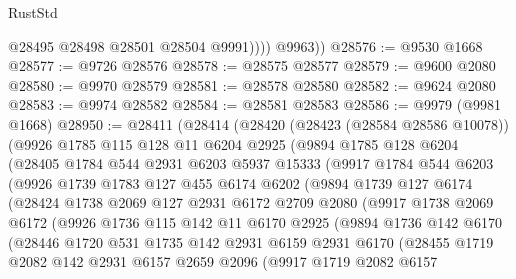 \begin{lexlean}{RustStd}
\begin{coremodule}
                @28495
                @28498
                @28501
                @28504
                @9991))))
        @9963))
@28576 := @9530 @1668
@28577 := @9726 @28576
@28578 := @28575 @28577
@28579 := @9600 @2080
@28580 := @9970 @28579
@28581 := @28578 @28580
@28582 := @9624 @2080
@28583 := @9974 @28582
@28584 := @28581 @28583
@28586 := @9979 (@9981 @1668)
@28950 := @28411
    (@28414
      (@28420
        (@28423 (@28584 @28586 @10078))
        (@9926
          @1785
          @115
          @128
          @11
          @6204
          @2925
          (@9894
            @1785
            @128
            @6204
            (@28405
              @1784
              @544
              @2931
              @6203
              @5937
              @15333
              (@9917
                @1784
                @544
                @6203
                (@9926
                  @1739
                  @1783
                  @127
                  @455
                  @6174
                  @6202
                  (@9894
                    @1739
                    @127
                    @6174
                    (@28424
                      @1738
                      @2069
                      @127
                      @2931
                      @6172
                      @2709
                      @2080
                      (@9917
                        @1738
                        @2069
                        @6172
                        (@9926
                          @1736
                          @115
                          @142
                          @11
                          @6170
                          @2925
                          (@9894
                            @1736
                            @142
                            @6170
                            (@28446
                              @1720
                              @531
                              @1735
                              @142
                              @2931
                              @6159
                              @2931
                              @6170
                              (@28455
                                @1719
                                @2082
                                @142
                                @2931
                                @6157
                                @2659
                                @2096
                                (@9917
                                  @1719
                                  @2082
                                  @6157

\end{coremodule}
\end{lexlean}
